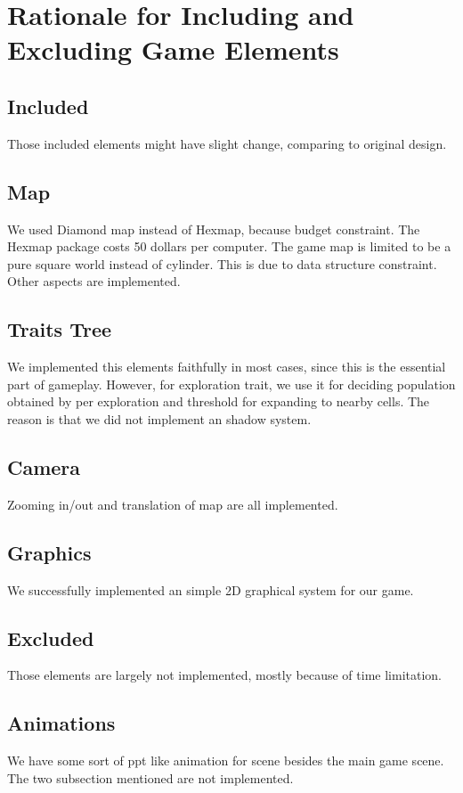 \section{Rationale for Including and Excluding Game Elements}

\subsection{Included}
Those included elements might have slight change, comparing to original design.
	\subsection{Map}
	We used Diamond map instead of Hexmap, because budget constraint. The Hexmap package costs 50 dollars per computer. The game map is limited to be a pure square world instead of cylinder. This is due to data structure constraint. Other aspects are implemented.
	\subsection{Traits Tree}
	We implemented this elements faithfully in most cases, since this is the essential part of gameplay. However, for exploration trait, we use it for deciding population obtained by per exploration and threshold for expanding to nearby cells. The reason is that we did not implement an shadow system.
	\subsection{Camera}
	Zooming in/out and translation of map are all implemented.

\subsection{Graphics}
We successfully implemented an simple 2D graphical system for our game.

\subsection{Excluded}
Those elements are largely not implemented, mostly because of time limitation.
\subsection{Animations}
We have some sort of ppt like animation for scene besides the main game scene. The two subsection mentioned are not implemented.
